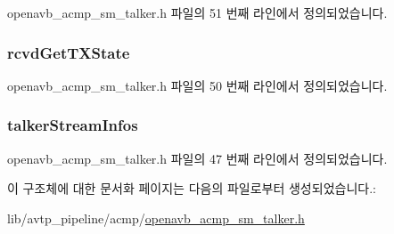 openavb\+\_\+acmp\+\_\+sm\+\_\+talker.\+h 파일의 51 번째 라인에서 정의되었습니다.

\subsubsection[{\texorpdfstring{rcvd\+Get\+T\+X\+State}{rcvdGetTXState}}]{ rcvd\+Get\+T\+X\+State}\hypertarget{structopenavb__acmp__sm__talker__vars__t_a259b97054b2c200011009c8b1d1a99be}{}\label{structopenavb__acmp__sm__talker__vars__t_a259b97054b2c200011009c8b1d1a99be}


openavb\+\_\+acmp\+\_\+sm\+\_\+talker.\+h 파일의 50 번째 라인에서 정의되었습니다.

\subsubsection[{\texorpdfstring{talker\+Stream\+Infos}{talkerStreamInfos}}]{ talker\+Stream\+Infos}\hypertarget{structopenavb__acmp__sm__talker__vars__t_a58e5ab953dfa4b58e1607e8cad895f76}{}\label{structopenavb__acmp__sm__talker__vars__t_a58e5ab953dfa4b58e1607e8cad895f76}


openavb\+\_\+acmp\+\_\+sm\+\_\+talker.\+h 파일의 47 번째 라인에서 정의되었습니다.



이 구조체에 대한 문서화 페이지는 다음의 파일로부터 생성되었습니다.\+:\begin{DoxyCompactItemize}
\item 
lib/avtp\+\_\+pipeline/acmp/\hyperlink{openavb__acmp__sm__talker_8h}{openavb\+\_\+acmp\+\_\+sm\+\_\+talker.\+h}\end{DoxyCompactItemize}
